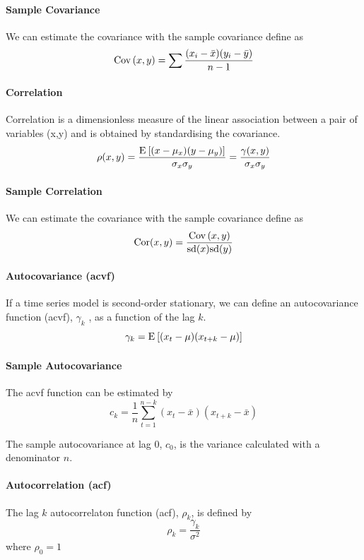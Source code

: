 \paragraph{Sample Covariance}
We can estimate the covariance with the sample covariance define as
\[ \mathrm{Cov} \left( x, y \right) = \sum \frac{(x_i - \bar{x})(y_i - \bar{y})}{n-1} \]

\paragraph{Correlation}
Correlation is a dimensionless measure of the linear association between a pair of variables (x,y) and is obtained by standardising the covariance.
\[ \rho(x, y) = \frac{\mathrm{E}_{} \left[ (x-\mu_x)(y-\mu_y) \right]}{\sigma_x \sigma_y} = \frac{\gamma(x,y)}{\sigma_x \sigma_y} \]
 
\paragraph{Sample Correlation}
We can estimate the covariance with the sample covariance define as
\[ \mathrm{Cor}(x, y) = \frac{\mathrm{Cov} \left( x, y \right)}{\mathrm{sd}(x)\mathrm{sd}(y)} \]

\paragraph{Autocovariance (acvf)}
If a time series model is second-order stationary, we can define an autocovariance function (acvf), $\gamma_k$ , as a function of the lag $k$.
\[ \gamma_k = \mathrm{E}_{} \left[ (x_t-\mu)(x_{t+k}-\mu) \right] \]

\paragraph{Sample Autocovariance}
The acvf function can be estimated by
\[ c_k = \frac{1}{n} \sum_{t=1}^{n-k} (x_t - \bar{x})(x_{t+k} - \bar{x}) \]

\begin{note}
The sample autocovariance at lag 0, $c_0$, is the variance calculated with a denominator $n$. 
\end{note}

\paragraph{Autocorrelation (acf)}
The lag $k$ autocorrelaton function (acf), $\rho_k$, is defined by
\[ \rho_k = \frac{\gamma_k}{\sigma^2} \]
where $\rho_0 = 1$

